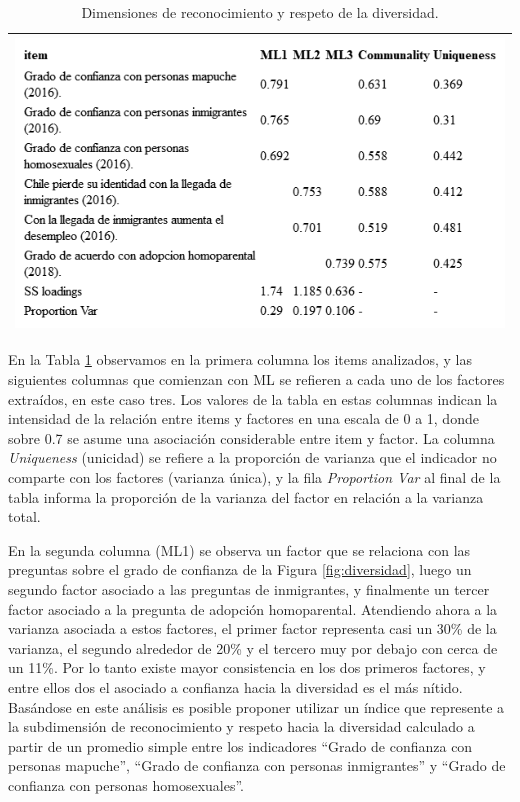 \documentclass[
  12pt,
]{book}
\begin{document}
\begin{longtable}[]{@{}l@{}}
\caption{\label{tab:div-fa}Dimensiones de reconocimiento y respeto de la diversidad.}\tabularnewline
\toprule
\endhead
\includegraphics[width=8.33333in,height=\textheight]{output/tables/div_fa.png} \\
\bottomrule
\end{longtable}

En la Tabla \ref{tab:div-fa} observamos en la primera columna los items analizados, y las siguientes columnas que comienzan con ML se refieren a cada uno de los factores extraídos, en este caso tres. Los valores de la tabla en estas columnas indican la intensidad de la relación entre items y factores en una escala de 0 a 1, donde sobre 0.7 se asume una asociación considerable entre item y factor. La columna \emph{Uniqueness} (unicidad) se refiere a la proporción de varianza que el indicador no comparte con los factores (varianza única), y la fila \emph{Proportion Var} al final de la tabla informa la proporción de la varianza del factor en relación a la varianza total.

En la segunda columna (ML1) se observa un factor que se relaciona con las preguntas sobre el grado de confianza de la Figura \ref{fig:diversidad}, luego un segundo factor asociado a las preguntas de inmigrantes, y finalmente un tercer factor asociado a la pregunta de adopción homoparental. Atendiendo ahora a la varianza asociada a estos factores, el primer factor representa casi un 30\% de la varianza, el segundo alrededor de 20\% y el tercero muy por debajo con cerca de un 11\%. Por lo tanto existe mayor consistencia en los dos primeros factores, y entre ellos dos el asociado a confianza hacia la diversidad es el más nítido. Basándose en este análisis es posible proponer utilizar un índice que represente a la subdimensión de reconocimiento y respeto hacia la diversidad calculado a partir de un promedio simple entre los indicadores ``Grado de confianza con personas mapuche'', ``Grado de confianza con personas inmigrantes'' y ``Grado de confianza con personas homosexuales''.
\end{document}

